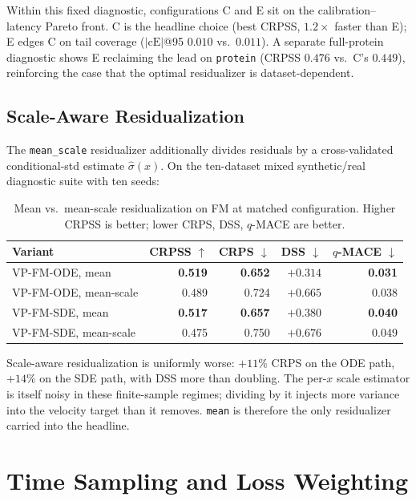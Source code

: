 \documentclass{tpm2026}
\begin{document}
Within this fixed diagnostic, configurations C and E sit on the calibration--latency Pareto front. C is the headline choice (best CRPSS, $1.2\times$ faster than E); E edges C on tail coverage ($|\text{cE}|$@95 $0.010$ vs.\ $0.011$). A separate full-protein diagnostic shows E reclaiming the lead on \texttt{protein} (CRPSS $0.476$ vs.\ C's $0.449$), reinforcing the case that the optimal residualizer is dataset-dependent.

\subsection{Scale-Aware Residualization}\label{app:mean-scale}

The \texttt{mean\_scale} residualizer additionally divides residuals by a cross-validated conditional-std estimate $\hat\sigma(x)$. On the ten-dataset mixed synthetic/real diagnostic suite with ten seeds:

\begin{table}[!h]
  \centering
  \caption{Mean vs.\ mean-scale residualization on FM at matched configuration. Higher CRPSS is better; lower CRPS, DSS, $q$-MACE are better.}\label{tab:mean-scale}
  \footnotesize
  \begin{tabular}{lrrrr}
    \toprule
    Variant & CRPSS $\uparrow$ & CRPS $\downarrow$ & DSS $\downarrow$ & $q$-MACE $\downarrow$ \\
    \midrule
    VP-FM-ODE, mean       & \textbf{0.519} & \textbf{0.652} & \textbf{$+0.314$} & \textbf{0.031} \\
    VP-FM-ODE, mean-scale & 0.489 & 0.724 & $+0.665$ & 0.038 \\
    VP-FM-SDE, mean       & \textbf{0.517} & \textbf{0.657} & \textbf{$+0.380$} & \textbf{0.040} \\
    VP-FM-SDE, mean-scale & 0.475 & 0.750 & $+0.676$ & 0.049 \\
    \bottomrule
  \end{tabular}
\end{table}

Scale-aware residualization is uniformly worse: $+11\%$ CRPS on the ODE path, $+14\%$ on the SDE path, with DSS more than doubling. The per-$x$ scale estimator is itself noisy in these finite-sample regimes; dividing by it injects more variance into the velocity target than it removes. \texttt{mean} is therefore the only residualizer carried into the headline.

\section{Time Sampling and Loss Weighting}\label{app:t-and-loss}
\end{document}
